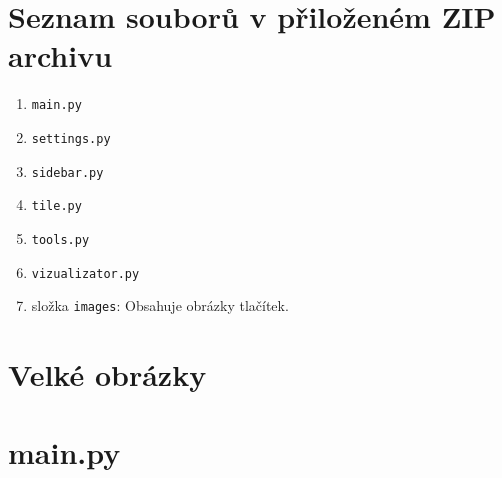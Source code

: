 \documentclass[12pt]{report}			%
\begin{document}
	
	\nocite{*}
    \printbibliography					%
    \printglossary[title={Zkratky}]		%
    \listoffigures						%
    \listoftables						%

    \begin{appendices}
    \chapter*{Seznam souborů v přiloženém ZIP archivu}
    \begin{enumerate}
    \item \texttt{main.py}
    \item \texttt{settings.py}
    \item \texttt{sidebar.py}
	\item \texttt{tile.py}
    \item \texttt{tools.py}
	\item \texttt{vizualizator.py}
	\item složka  \texttt{images}: Obsahuje obrázky tlačítek.
    \end{enumerate}
	\chapter{Velké obrázky}

	\chapter{main.py}

	\end{appendices}
\end{document}
